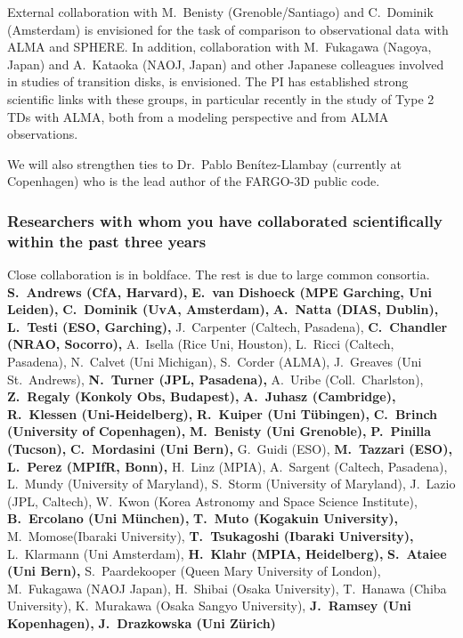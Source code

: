 \documentclass[10pt,fleqn,twoside,a4paper]{article}
\begin{document}
External collaboration with M.~Benisty (Grenoble/Santiago) and C.~Dominik
(Amsterdam) is envisioned for the task of comparison to observational data
with ALMA and SPHERE.  In addition, collaboration with M.~Fukagawa (Nagoya,
Japan) and A.~Kataoka (NAOJ, Japan) and other Japanese colleagues involved
in studies of transition disks, is envisioned. The PI has established strong
scientific links with these groups, in particular recently in the study of
Type 2 TDs with ALMA, both from a modeling perspective and from ALMA
observations.

We will also strengthen ties to Dr.~Pablo Ben\'itez-Llambay (currently
at Copenhagen) who is the lead author of the FARGO-3D public code. 



\subsubsection{Researchers with whom you have collaborated scientifically within the past three years}

{\small
Close collaboration is in boldface. The rest is due to large common consortia.\\
{\bf S.~Andrews (CfA, Harvard),}
{\bf E.~van Dishoeck (MPE Garching, Uni Leiden),}
{\bf C.~Dominik (UvA, Amsterdam),}
{\bf A.~Natta (DIAS, Dublin),}
{\bf L.~Testi (ESO, Garching),}
J.~Carpenter (Caltech, Pasadena),
{\bf C.~Chandler (NRAO, Socorro),}
A.~Isella (Rice Uni, Houston),
L.~Ricci (Caltech, Pasadena),
N.~Calvet (Uni Michigan),
S.~Corder (ALMA),
J.~Greaves (Uni St.~Andrews),
{\bf N.~Turner (JPL, Pasadena),}
A.~Uribe (Coll.~Charlston),
{\bf Z.~Regaly (Konkoly Obs, Budapest),}
{\bf A.~Juhasz (Cambridge),}
{\bf R.~Klessen (Uni-Heidelberg),}
{\bf R.~Kuiper (Uni T\"ubingen),}
{\bf C.~Brinch (University of Copenhagen),}
{\bf M.~Benisty (Uni Grenoble),}
{\bf P.~Pinilla (Tucson),}
{\bf C.~Mordasini (Uni Bern),}
G.~Guidi (ESO),
{\bf M.~Tazzari (ESO),}
{\bf L.~Perez (MPIfR, Bonn),}
H.~Linz (MPIA),
A.~Sargent (Caltech, Pasadena),
L.~Mundy (University of Maryland),
S.~Storm (University of Maryland),
J.~Lazio (JPL, Caltech),
W.~Kwon (Korea Astronomy and Space Science Institute),
{\bf B.~Ercolano (Uni M\"unchen),}
{\bf T.~Muto (Kogakuin University),}
M.~Momose(Ibaraki University),
{\bf T.~Tsukagoshi (Ibaraki University),}
L.~Klarmann (Uni Amsterdam),
{\bf H.~Klahr (MPIA, Heidelberg),}
{\bf S.~Ataiee (Uni Bern),}
S.~Paardekooper (Queen Mary University of London),
M.~Fukagawa (NAOJ Japan),
H.~Shibai (Osaka University),
T.~Hanawa (Chiba University),
K.~Murakawa (Osaka Sangyo University),
{\bf J.~Ramsey (Uni Kopenhagen),}
{\bf J.~Drazkowska (Uni Z\"urich)}
}
\end{document}
